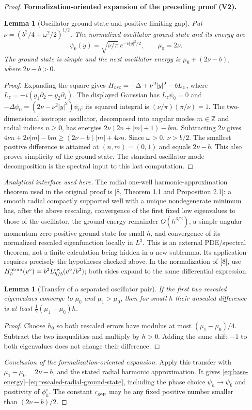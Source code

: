\documentclass[11pt]{article}
\newtheorem{lemma}[theorem]{Lemma}
\newcommand{\formalisationparentid}{X}
\newenvironment{formalisationaddition}[1]{\par\medskip\begingroup\color{blue}\def\formalisationparentid{#1}\setcounter{formalizationsublemma}{0}\let\lemma\formalizationsublemma\let\endlemma\endformalizationsublemma
  \def\Eo{\mathcal E_h^\circ}\def\EE{\mathcal E_h}\def\phio{\phi_h^\circ}\def\phih{\phi_h}\def\Ho{H_h^{\rm atom}(v^\circ)}\def\Ha{H_h^{\rm atom}}\def\HL{H_h^{L}}\def\Dh{D_h}\def\Log{\operatorname{Log}}\def\ellh{\ell_h}\def\Gp{G_{p,h}}\def\Ast{A_{*,h}}\def\ahat{\widehat{\mathfrak a}_h}\def\ah{\mathfrak a_h}\def\rh{\widehat\rho_h}\def\deltah{\widehat\delta_h}\def\oldref##1{\textup{(##1)}}\def\interface##1{\par\noindent\textit{Analytical interface used here.} ##1\par}\def\finish{\par\noindent\textit{Conclusion of the formalization-oriented expansion.} }\par\noindent\textbf{Formalization-oriented expansion of the preceding proof (V2).}\par\smallskip
}{\par\endgroup\medskip
}
\begin{document}
\begin{proof}
\begin{formalisationaddition}{L2.1}
\begin{lemma}[Oscillator ground state and positive limiting gap]\label{sublemma:L2-1-oscillator}
Put $\nu=(b^2/4+\omega^2/2)^{1/2}$. The normalized oscillator ground state and its energy are
\[
 \psi_0(y)=\sqrt{\nu/\pi}\,e^{-\nu|y|^2/2},\qquad \mu_0=2\nu.
\]
The ground state is simple and the next oscillator energy is $\mu_0+(2\nu-b)$, where $2\nu-b>0$.
\end{lemma}
\begin{proof}
Expanding the square gives $H_{\rm osc}=-\Delta+\nu^2|y|^2-bL_z$, where $L_z=-i(y_1\partial_2-y_2\partial_1)$. The displayed Gaussian has $L_z\psi_0=0$ and
$-\Delta\psi_0=(2\nu-\nu^2|y|^2)\psi_0$; its squared integral is $(\nu/\pi)(\pi/\nu)=1$.
The two-dimensional isotropic oscillator, decomposed into angular modes $m\in\mathbb Z$ and radial indices $n\ge0$, has energies
$2\nu(2n+|m|+1)-bm$.
Subtracting $2\nu$ gives $4\nu n+2\nu|m|-bm\ge(2\nu-b)|m|+4\nu n$.
Since $\omega>0$, $\nu>b/2$. The smallest positive difference is attained at $(n,m)=(0,1)$ and equals $2\nu-b$. This also proves simplicity of the ground state. The standard oscillator mode decomposition is the spectral input to this last computation.
\end{proof}

\interface{The radial one-well harmonic-approximation theorem used in the original proof is [8, Theorem 1.1 and Proposition 2.1]: a smooth radial compactly supported well with a unique nondegenerate minimum has, after the above rescaling, convergence of the first fixed low eigenvalues to those of the oscillator, the ground-energy remainder $O(h^{3/2})$, a simple angular-momentum-zero positive ground state for small $h$, and convergence of its normalized rescaled eigenfunction locally in $L^2$. This is an external PDE/spectral theorem, not a finite calculation being hidden in a new sublemma. Its application requires precisely the hypotheses checked above. In the normalization of [8], use $\Ho=b^2L^{\rm sw}_{h/b}(v^\circ/b^2)$; both sides expand to the same differential expression.}

\begin{lemma}[Transfer of a separated oscillator pair]\label{sublemma:L2-1-gap-transfer}
If the first two rescaled eigenvalues converge to $\mu_0$ and $\mu_1>\mu_0$, then for small $h$ their unscaled difference is at least $\frac12(\mu_1-\mu_0)h$.
\end{lemma}
\begin{proof}
Choose $h_0$ so both rescaled errors have modulus at most $(\mu_1-\mu_0)/4$. Subtract the two inequalities and multiply by $h>0$. Adding the same shift $-1$ to both eigenvalues does not change their difference.
\end{proof}
\finish Apply this transfer with $\mu_1-\mu_0=2\nu-b$, and the stated radial harmonic approximation. It gives \eqref{eq:base-energy}--\eqref{eq:rescaled-radial-ground-state}, including the phase choice $\psi_h\to\psi_0$ and positivity of $\phi_h^\circ$. The constant $c_{\rm gap}$ may be any fixed positive number smaller than $(2\nu-b)/2$.
\end{formalisationaddition}

\end{proof}
\end{document}
